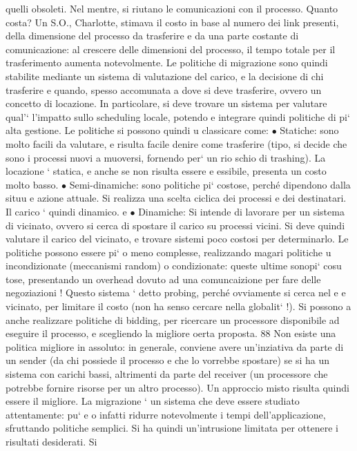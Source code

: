 \documentclass[a4paper,12pt]{article}
\begin{document}
quelli obsoleti. Nel mentre, si riutano le comunicazioni con il processo.
Quanto costa? Un S.O., Charlotte, stimava il costo in base al numero dei
link presenti, della dimensione del processo da trasferire e da una parte costante
di comunicazione: al crescere delle dimensioni del processo, il tempo totale per
il trasferimento aumenta notevolmente.
Le politiche di migrazione sono quindi stabilite mediante un sistema di valutazione del carico, e la decisione di chi
trasferire e quando, spesso accomunata
a dove si deve trasferire, ovvero un concetto di locazione. In particolare, si deve
trovare un sistema per valutare qual'` l'impatto sullo scheduling locale, potendo
e
integrare quindi politiche di pi` alta gestione. Le politiche si possono quindi
u
classicare come:
$\bullet$ Statiche: sono molto facili da valutare, e risulta facile denire come trasferire
(tipo, si decide che sono i processi nuovi a muoversi, fornendo per` un rio
schio di trashing). La locazione ` statica, e anche se non risulta essere
e
essibile, presenta un costo molto basso.
$\bullet$ Semi-dinamiche: sono politiche pi` costose, perché dipendono dalla situu
e
azione attuale. Si realizza una scelta ciclica dei processi e dei destinatari.
Il carico ` quindi dinamico.
e
$\bullet$ Dinamiche: Si intende di lavorare per un sistema di vicinato, ovvero si
cerca di spostare il carico su processi vicini. Si deve quindi valutare il
carico del vicinato, e trovare sistemi poco costosi per determinarlo.
Le politiche possono essere pi` o meno complesse, realizzando magari politiche
u
incondizionate (meccanismi random) o condizionate: queste ultime sonopi` cosu
tose, presentando un overhead dovuto ad una comuncaizione per fare delle negoziazioni ! Questo sistema ` detto probing,
perché ovviamente si cerca nel
e
e
vicinato, per limitare il costo (non ha senso cercare nella globalit` !). Si possono
a
anche realizzare politiche di bidding, per ricercare un processore disponibile ad
eseguire il processo, e scegliendo la migliore oerta proposta.
88
Non esiste una politica migliore in assoluto: in generale, conviene avere
un'inziativa da parte di un sender (da chi possiede il processo e che lo vorrebbe
spostare) se si ha un sistema con carichi bassi, altrimenti da parte del receiver
(un processore che potrebbe fornire risorse per un altro processo). Un approccio
misto risulta quindi essere il migliore.
La migrazione ` un sistema che deve essere studiato attentamente: pu`
e
o
infatti ridurre notevolmente i tempi dell'applicazione, sfruttando politiche semplici. Si ha quindi un'intrusione
limitata per ottenere i risultati desiderati. Si
\end{document}
